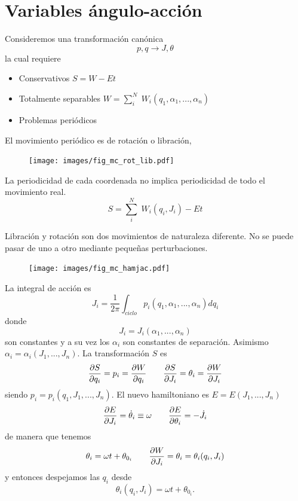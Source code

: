 \documentclass[10pt,oneside]{CBFT_book}
\begin{document}
\section{Variables ángulo-acción}

Consideremos una transformación canónica 
\[
	p,q \longrightarrow J,\theta
\]
la cual requiere
\begin{itemize}
 \item Conservativos $S = W - Et $
 \item Totalmente separables $W = \sum_i^N \; W_i(q_1,\alpha_1,...,\alpha_n)$
 \item Problemas periódicos
\end{itemize}

El movimiento periódico es de rotación o libración,
\begin{figure}[htb]
	\begin{center}
	\texttt{[image: images/fig\_mc\_rot\_lib.pdf]}	 
	\end{center}
	\caption{}
\end{figure} 

La periodicidad de cada coordenada no implica periodicidad de todo el movimiento real.
\[
	S = \sum_i^N \; W_i(q_i,J_i) - Et
\]

Libración y rotación son dos movimientos de naturaleza diferente. No se puede pasar de
uno a otro mediante pequeñas perturbaciones.

\begin{figure}
	\begin{center}
	\texttt{[image: images/fig\_mc\_hamjac.pdf]}	 
	\end{center}
	\caption{}
\end{figure} 

La integral de acción es
\[
	J_i = \frac{1}{2\pi}\int_{ciclo} p_i(q_1,\alpha_1,...,\alpha_n) dq_i
\]
donde 
\[
	J_i = J_i(\alpha_1,...,\alpha_n)
\]
son constantes y a su vez los $\alpha_i$ son constantes de separación.
Asimismo $\alpha_i=\alpha_i(J_1,...,J_n)$. 
La transformación $S$ es 
\[
	\frac{\partial^{\hspace{-0.05em}} {S}}{\partial {q_i}^{\hspace{-0.05em}}} = p_i = \frac{\partial^{\hspace{-0.05em}} {W}}{\partial {q_i}^{\hspace{-0.05em}}} \qquad \frac{\partial^{\hspace{-0.05em}} {S}}{\partial {J_i}^{\hspace{-0.05em}}} = \theta_i = \frac{\partial^{\hspace{-0.05em}} {W}}{\partial {J_i}^{\hspace{-0.05em}}}
\]
siendo $p_i = p_i(q_1,J_1,...,J_n)$.
El nuevo hamiltoniano es $E=E(J_1,...,J_n)$
\[
	\frac{\partial^{\hspace{-0.05em}} {E}}{\partial {J_i}^{\hspace{-0.05em}}} = \dot{\theta}_i \equiv \omega \qquad \frac{\partial^{\hspace{-0.05em}} {E}}{\partial {\theta_i}^{\hspace{-0.05em}}} = -\dot{J}_i
\]
de manera que tenemos
\[
	\theta_i = \omega t + \theta_{0_i} \qquad  \frac{\partial^{\hspace{-0.05em}} {W}}{\partial {J_i}^{\hspace{-0.05em}}} = \theta_i = \theta_i(q_i, J_i)
\]
y entonces despejamos las $q_i$ desde
\[
	\theta_i(q_i, J_i) = \omega t + \theta_{0_i}.
\]
\end{document}
